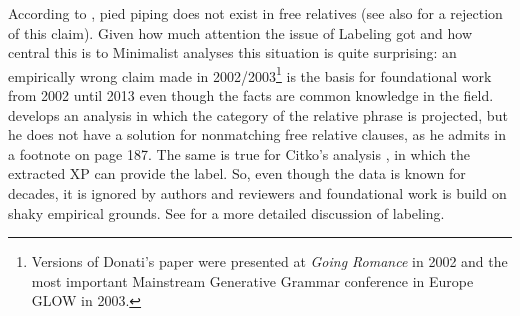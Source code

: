 \documentclass[output=paper]{langsci/langscibook}
\begin{document}
According to \citet[Section~5]{Donati2006a-u}, pied piping does not
exist in free relatives  (see also  for a rejection of this
claim). Given how much attention the issue of Labeling got and how central this is 
to Minimalist analyses this situation is quite surprising: an empirically wrong claim made in 2002/2003\footnote{
  Versions of Donati's paper were presented at \emph{Going Romance} in 2002 and the most important
  Mainstream Generative Grammar conference in Europe GLOW in 2003.%
} is the basis for foundational work from 2002 until 2013 even though the facts are common knowledge
in the field. \citet{Ott2011a} develops an analysis in which the category of the relative phrase is
projected, but he does not have a solution for nonmatching free relative clauses, as he admits in a
footnote on page 187. The same is true for Citko's analysis \citeyearpar{Citko2008a}, in which the
extracted XP can provide the label. So, even though the data is known for decades, it is ignored by
authors and reviewers and foundational work is build on shaky empirical grounds. See
 for a more detailed discussion of labeling.
\end{document}
